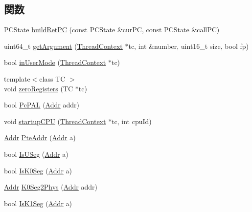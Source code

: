 \subsection*{関数}
\begin{DoxyCompactItemize}
\item 
PCState \hyperlink{namespaceAlphaISA_a7480844aa2eaec6bd5e60412bf6c4a38}{buildRetPC} (const PCState \&curPC, const PCState \&callPC)
\item 
uint64\_\-t \hyperlink{namespaceAlphaISA_a3f9560369e934be05b1dd8f23fbd6104}{getArgument} (\hyperlink{classThreadContext}{ThreadContext} $\ast$tc, int \&number, uint16\_\-t size, bool fp)
\item 
bool \hyperlink{namespaceAlphaISA_a166daa198f05f80c18b5249f18a0675e}{inUserMode} (\hyperlink{classThreadContext}{ThreadContext} $\ast$tc)
\item 
{\footnotesize template$<$class TC $>$ }\\void \hyperlink{namespaceAlphaISA_ae69d09a8a385eb3239db7d28788f9f3f}{zeroRegisters} (TC $\ast$tc)
\item 
bool \hyperlink{namespaceAlphaISA_a890ffda2717ffc0e2cd0e9f80b90fad2}{PcPAL} (\hyperlink{base_2types_8hh_af1bb03d6a4ee096394a6749f0a169232}{Addr} addr)
\item 
void \hyperlink{namespaceAlphaISA_a65b7ec798c399b980dc23332b8684a0b}{startupCPU} (\hyperlink{classThreadContext}{ThreadContext} $\ast$tc, int cpuId)
\item 
\hyperlink{base_2types_8hh_af1bb03d6a4ee096394a6749f0a169232}{Addr} \hyperlink{namespaceAlphaISA_a7011d6b73edace006e7c43b09d9ae703}{PteAddr} (\hyperlink{base_2types_8hh_af1bb03d6a4ee096394a6749f0a169232}{Addr} a)
\item 
bool \hyperlink{namespaceAlphaISA_a2451f4cdda3759a112904a5bf9adc948}{IsUSeg} (\hyperlink{base_2types_8hh_af1bb03d6a4ee096394a6749f0a169232}{Addr} a)
\item 
bool \hyperlink{namespaceAlphaISA_ae30e2a62fc7b8017254375687db343ee}{IsK0Seg} (\hyperlink{base_2types_8hh_af1bb03d6a4ee096394a6749f0a169232}{Addr} a)
\item 
\hyperlink{base_2types_8hh_af1bb03d6a4ee096394a6749f0a169232}{Addr} \hyperlink{namespaceAlphaISA_a3429ac3cc50f87a6522ce09b611ea974}{K0Seg2Phys} (\hyperlink{base_2types_8hh_af1bb03d6a4ee096394a6749f0a169232}{Addr} addr)
\item 
bool \hyperlink{namespaceAlphaISA_ab93fa394a0732944836267b5ca194e99}{IsK1Seg} (\hyperlink{base_2types_8hh_af1bb03d6a4ee096394a6749f0a169232}{Addr} a)
\item 

\end{DoxyCompactItemize}
